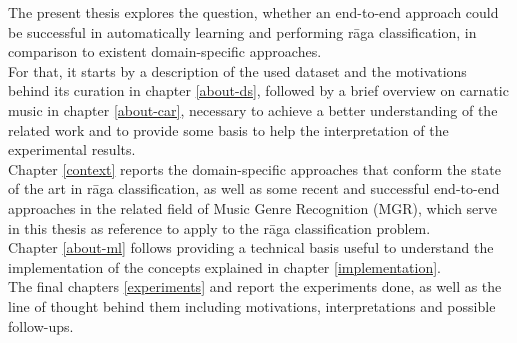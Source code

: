 The present thesis explores the question, whether an end-to-end approach could be successful in automatically learning and performing r\=aga classification, in comparison to existent domain-specific approaches.\\

For that, it starts by a description of the used dataset and the motivations behind its curation in chapter \ref{about-ds}, followed by a brief overview on carnatic music in chapter \ref{about-car}, necessary to achieve a better understanding of the related work and to provide some basis to help the interpretation of the experimental results.\\

Chapter \ref{context} reports the domain-specific approaches that conform the state of the art in r\=aga classification, as well as some recent and successful end-to-end approaches in the related field of Music Genre Recognition (MGR), which serve in this thesis as reference to apply to the r\=aga classification problem.\\

Chapter \ref{about-ml} follows providing a technical basis useful to understand the implementation of the concepts explained in chapter \ref{implementation}.\\

The final chapters \ref{experiments} and \label{conclusion} report the experiments done, as well as the line of thought behind them including motivations, interpretations and possible follow-ups.
